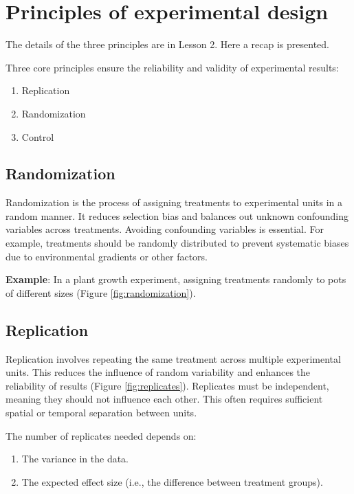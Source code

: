 \documentclass[
]{book}
\providecommand{\tightlist}{%
  \setlength{\itemsep}{0pt}\setlength{\parskip}{0pt}}
\begin{document}
\section{Principles of experimental design}\label{principles-of-experimental-design}

The details of the three principles are in Lesson 2. Here a recap is presented.

Three core principles ensure the reliability and validity of experimental results:

\begin{enumerate}
\def\labelenumi{\arabic{enumi}.}
\tightlist
\item
  Replication
\item
  Randomization
\item
  Control
\end{enumerate}

\subsection{Randomization}\label{randomization-1}

Randomization is the process of assigning treatments to experimental units in a random manner. It reduces selection bias and balances out unknown confounding variables across treatments. Avoiding confounding variables is essential. For example, treatments should be randomly distributed to prevent systematic biases due to environmental gradients or other factors.

\textbf{Example}: In a plant growth experiment, assigning treatments randomly to pots of different sizes (Figure \ref{fig:randomization}).

\subsection{Replication}\label{replication-1}

Replication involves repeating the same treatment across multiple experimental units. This reduces the influence of random variability and enhances the reliability of results (Figure \ref{fig:replicates}). Replicates must be independent, meaning they should not influence each other. This often requires sufficient spatial or temporal separation between units.

The number of replicates needed depends on:

\begin{enumerate}
\def\labelenumi{\arabic{enumi}.}
\tightlist
\item
  The variance in the data.
\item
  The expected effect size (i.e., the difference between treatment groups).
\end{enumerate}
\end{document}
